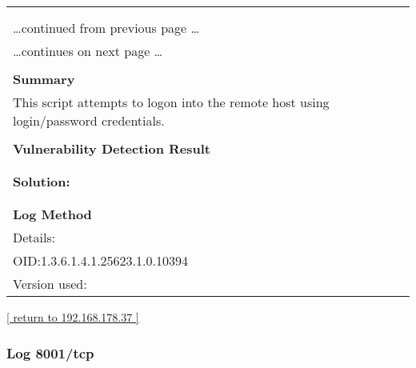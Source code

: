 \documentclass{article}
\begin{document}
\begin{longtable}{|p{}|}
\hline
\rowcolor{gvm_log}{\color{white}{Log (CVSS: 0.0) }}\\
\rowcolor{gvm_log}{\color{white}{NVT: SMB log in}}\\
\hline
\endfirsthead
\hfill\ldots continued from previous page \ldots \\
\hline
\endhead
\hline
\ldots continues on next page \ldots \\
\endfoot
\hline
\endlastfoot
\\
\textbf{Summary}\\
This script attempts to logon into the remote host using
  login/password credentials.\\

        \hline
        \\
\textbf{Vulnerability Detection Result}\\
\rowcolor{white}{\verb=It was possible to log into the remote host using the SMB protocol.=}\\

          \hline
          \\
\textbf{Solution:}\\
\\


        \hline
        \\
\textbf{Log Method}\\
Details:
\rowcolor{white}{\verb=SMB log in=}\\
OID:1.3.6.1.4.1.25623.1.0.10394\\
Version used:
\rowcolor{white}{\verb=2021-08-11T09:39:10Z=}\\
\end{longtable}

\begin{footnotesize}\hyperref[host:192.168.178.37]{[ return to 192.168.178.37 ]}\end{footnotesize}
\subsubsection{Log 8001/tcp}
\label{port:192.168.178.37 8001/tcp Log}
\end{document}
